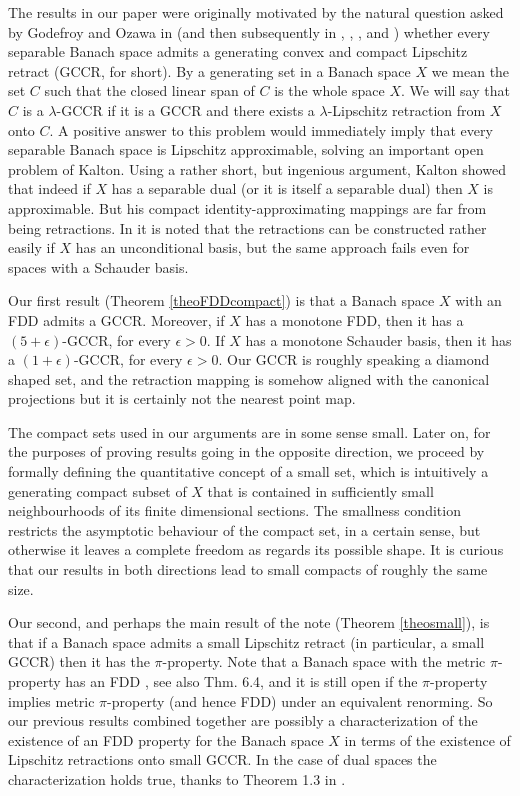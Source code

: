 \documentclass[11pt]{amsart}
\newcommand{\<}{\langle}
\renewcommand{\>}{\rangle}
\theoremstyle{definition}
\theoremstyle{remark}
\numberwithin{equation}{section}
\begin{document}
The results in our paper were originally motivated by the natural question asked by Godefroy and Ozawa in \cite{GO14}
(and then subsequently in \cite{God15}, \cite{God215}, \cite{God20},  and \cite{GP19}) whether every
separable Banach space admits a generating convex and compact Lipschitz retract (GCCR, for short).
By a generating  set in a Banach space $X$ we mean the set $C$ such that the closed linear span of $C$ is the whole space $X$.
We will say that $C$ is a $\lambda$-GCCR if it is a GCCR and there exists a $\lambda$-Lipschitz retraction from $X$ onto $C$.
A positive answer to this problem would immediately imply that every separable Banach space is
Lipschitz approximable, solving an important open problem of Kalton.
Using a rather short, but ingenious argument, Kalton \cite{Kal12} showed that indeed if $X$ has a separable dual
(or it is itself a separable dual) then $X$
is approximable. But his compact identity-approximating mappings are far from being retractions. In \cite{GO14}
it is noted that the retractions can be constructed rather easily if $X$ has an unconditional basis, but the same approach 
fails even for spaces with a Schauder basis.



Our first result (Theorem \ref{theoFDDcompact}) is that a Banach space $X$  with an FDD admits a GCCR. Moreover, if
$X$ has a monotone FDD, then it has a  $(5+\epsilon)$-GCCR, for every $\epsilon>0$. If
$X$ has a monotone Schauder basis, then it has a  $(1+\epsilon)$-GCCR, for every $\epsilon>0$. 
Our GCCR is roughly speaking a diamond shaped set, and the
 retraction mapping is somehow aligned with the 
canonical projections but it is certainly not the nearest point map.  

The compact sets used in our arguments
are in some sense small. Later on, for the purposes of proving  results going in the opposite direction, we proceed by formally defining the
quantitative  concept of a small set, which is intuitively a generating compact
subset of $X$  that  is contained in sufficiently small neighbourhoods of its finite dimensional sections.
The smallness condition restricts the asymptotic behaviour of the compact set, in a certain sense, but  otherwise it leaves a
 complete freedom as regards its possible shape.  It is curious that  our  results in both directions
lead to small compacts of roughly the same size.

 Our second, and perhaps the main result of the note (Theorem \ref{theosmall}),  is that
if a Banach space admits a small Lipschitz retract (in particular, a small  GCCR)  then it has the $\pi$-property.
Note that a Banach space with the metric $\pi$-property has an FDD \cite{JW70}, see also \cite{Cas01} Thm. 6.4, 
and it is still open if the $\pi$-property implies metric $\pi$-property (and hence FDD) under an equivalent renorming.
So our previous results combined together are possibly a characterization of  the existence of an FDD property for the Banach space $X$  in terms of 
the existence of Lipschitz retractions onto small GCCR. In the case of dual spaces the characterization holds true, thanks to Theorem 1.3 in \cite{Joh2}.
\end{document}
